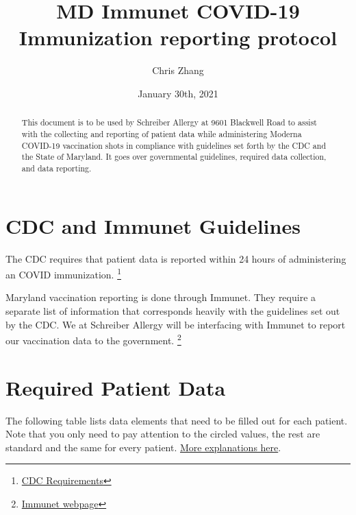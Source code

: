 \documentclass{article}
\title{MD Immunet COVID-19 Immunization reporting protocol}
\author{Chris Zhang}
\date{January 30th, 2021}
\begin{document}
\maketitle
\begin{abstract}

This document is to be used by Schreiber Allergy at 9601 Blackwell Road to assist with the collecting and reporting of patient data while administering Moderna COVID-19 vaccination shots in compliance with guidelines set forth by the CDC and the State of Maryland. It goes over governmental guidelines, required data collection, and data reporting. 

\end{abstract}

\section{CDC and Immunet Guidelines}
The CDC requires that patient data is reported within 24 hours of administering an COVID immunization. \footnote{\href{https://www.cdc.gov/vaccines/covid-19/vaccination-provider-support.html}{CDC Requirements}} 

Maryland vaccination reporting is done through Immunet. They require a separate list of information that corresponds heavily with the guidelines set out by the CDC. We at Schreiber Allergy will be interfacing with Immunet to report our vaccination data to the government. \footnote{\href{https://www.mdimmunet.org}{Immunet webpage}}



\section{Required Patient Data}


The following table lists data elements that need to be filled out for each patient. Note that you only need to pay attention to the circled values, the rest are standard and the same for every patient. \href{https://www.mdimmunet.org/ir_docs/CSVFile_gts.pdf}{More explanations here}.
\end{document}

